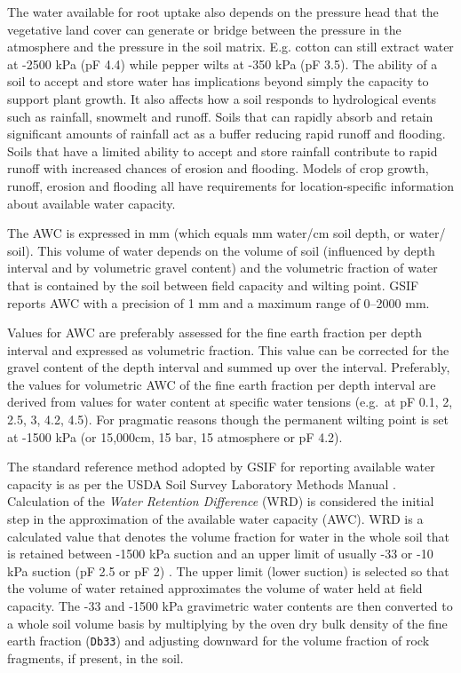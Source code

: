 \documentclass[graybox,natbib,nospthms,UStrade]{svmono}
\begin{document}
The water available for root uptake also depends on the pressure head
that the vegetative land cover can generate or bridge between the
pressure in the atmosphere and the pressure in the soil matrix. E.g.
cotton can still extract water at -2500 kPa (pF 4.4) while pepper wilts at -350 kPa (pF
3.5). The ability of a soil to accept and store water has implications
beyond simply the capacity to support plant growth. It also affects how
a soil responds to hydrological events such as rainfall, snowmelt and
runoff. Soils that can rapidly absorb and retain significant amounts of
rainfall act as a buffer reducing rapid runoff and flooding. Soils that
have a limited ability to accept and store rainfall contribute to rapid
runoff with increased chances of erosion and flooding. Models of crop
growth, runoff, erosion and flooding all have requirements for
location-specific information about available water capacity.

The AWC is expressed in mm (which equals mm water/cm soil depth, or
water/ soil). This volume of water depends on the volume of soil
(influenced by depth interval and by volumetric gravel content) and the
volumetric fraction of water that is contained by the soil between field
capacity and wilting point. GSIF reports AWC with a precision of 1 mm
and a maximum range of 0--2000 mm.

Values for AWC are preferably assessed for the fine earth fraction per
depth interval and expressed as volumetric fraction. This value can be
corrected for the gravel content of the depth interval and summed up
over the interval. Preferably, the values for volumetric AWC of the fine
earth fraction per depth interval are derived from values for water
content at specific water tensions (e.g.~at pF 0.1, 2, 2.5, 3, 4.2,
4.5). For pragmatic reasons though the permanent wilting point is set at
-1500 kPa (or 15,000cm, 15 bar, 15 atmosphere or pF 4.2).

The standard reference method adopted by GSIF for reporting available
water capacity is as per the USDA Soil Survey Laboratory Methods Manual
\citep[ p.137]{Burt2004SSIR}. Calculation of the \emph{Water Retention Difference}
(WRD) is considered the initial step in the approximation of the
available water capacity (AWC). WRD is a calculated value that denotes
the volume fraction for water in the whole soil that is retained between -1500 kPa suction and an upper limit of usually -33 or -10 kPa suction (pF 2.5 or pF 2)
\citep[ p.137]{Burt2004SSIR}. The upper limit (lower suction) is selected so
that the volume of water retained approximates the volume of water held
at field capacity. The -33 and -1500 kPa gravimetric water contents are then
converted to a whole soil volume basis by multiplying by the oven dry
bulk density of the fine earth fraction (\texttt{Db33}) and adjusting downward
for the volume fraction of rock fragments, if present, in the soil.
\end{document}

